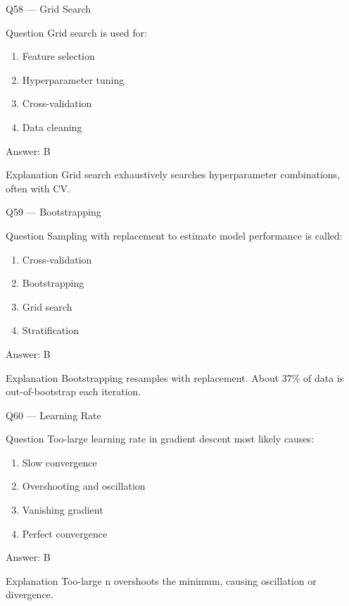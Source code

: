 \documentclass[aspectratio=169,8pt]{beamer}
\begin{document}
	\begin{frame}{Q58 --- Grid Search}
		\begin{block}{Question}
			Grid search is used for:
		\end{block}
		\begin{enumerate}
			\item Feature selection
			\item Hyperparameter tuning
			\item Cross-validation
			\item Data cleaning
		\end{enumerate}
		\begin{exampleblock}{Answer: B}\end{exampleblock}
		\begin{block}{Explanation}
			Grid search exhaustively searches hyperparameter combinations, often with CV.
		\end{block}
	\end{frame}
	
	\begin{frame}{Q59 --- Bootstrapping}
		\begin{block}{Question}
			Sampling with replacement to estimate model performance is called:
		\end{block}
		\begin{enumerate}
			\item Cross-validation
			\item Bootstrapping
			\item Grid search
			\item Stratification
		\end{enumerate}
		\begin{exampleblock}{Answer: B}\end{exampleblock}
		\begin{block}{Explanation}
			Bootstrapping resamples with replacement. About 37\% of data is out-of-bootstrap each iteration.
		\end{block}
	\end{frame}
	
	\begin{frame}{Q60 --- Learning Rate}
		\begin{block}{Question}
			Too-large learning rate in gradient descent most likely causes:
		\end{block}
		\begin{enumerate}
			\item Slow convergence
			\item Overshooting and oscillation
			\item Vanishing gradient
			\item Perfect convergence
		\end{enumerate}
		\begin{exampleblock}{Answer: B}\end{exampleblock}
		\begin{block}{Explanation}
			Too-large n overshoots the minimum, causing oscillation or divergence.
		\end{block}
	\end{frame}
	
\end{document}
